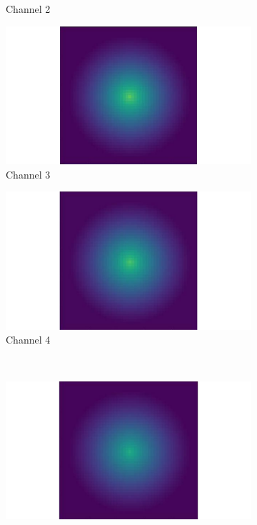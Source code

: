 \begin{figure}[htbp]
\begin{minipage}{0.87\textwidth}
\begin{subfigure}{0.23\textwidth}
            \caption{Channel 2}
        \end{subfigure}
        \begin{subfigure}{0.23\textwidth}
            \includegraphics[width=\textwidth]{figures/raw_data/21/T3500/channel_3.pdf}
            \caption{Channel 3}
        \end{subfigure}
        \begin{subfigure}{0.23\textwidth}
            \includegraphics[width=\textwidth]{figures/raw_data/21/T3500/channel_4.pdf}
            \caption{Channel 4}
        \end{subfigure}\\
        \begin{subfigure}{0.23\textwidth}
            \includegraphics[width=\textwidth]{figures/raw_data/21/T3500/channel_5.pdf}

\end{subfigure}
\end{minipage}
\end{figure}

